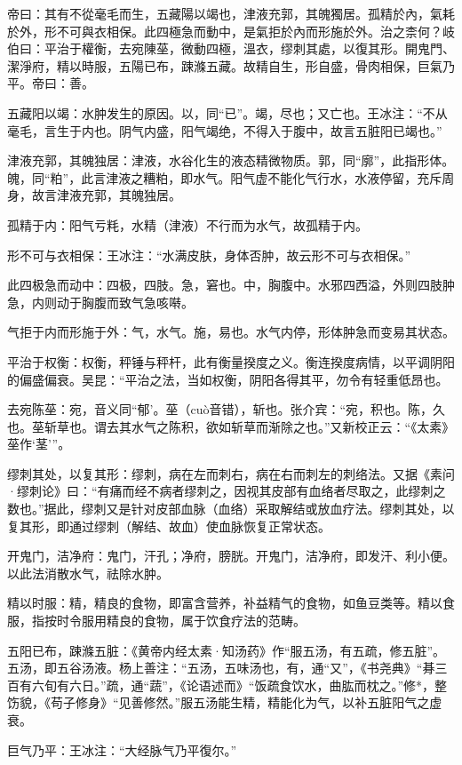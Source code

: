 \documentclass[draft,12pt]{ctexbook}
\begin{document}

\begin{yuanwen}
帝曰：其有不從毫毛而生，五藏陽以竭也，津液充郭，其魄獨居。孤精於內，氣耗於外，形不可與衣相保。此四極急而動中，是氣拒於內而形施於外。治之柰何？岐伯曰：平治于權衡，去宛陳莝，微動四極，溫衣，缪刺其處，以復其形。開鬼門、潔淨府，精以時服，五陽已布，踈滌五藏。故精自生，形自盛，骨肉相保，巨氣乃平。帝曰：善。
\end{yuanwen}


\begin{jiaozhu}
  \item 五藏阳以竭：水肿发生的原因。以，同“已”。竭，尽也；又亡也。王冰注：“不从毫毛，言生于内也。阴气内盛，阳气竭绝，不得入于腹中，故言五脏阳已竭也。”
  \item 津液充郭，其魄独居：津液，水谷化生的液态精微物质。郭，同“廓”，此指形体。魄，同“粕”，此言津液之糟粕，即水气。阳气虚不能化气行水，水液停留，充斥周身，故言津液充郭，其魄独居。
  \item 孤精于内：阳气亏粍，水精（津液）不行而为水气，故孤精于内。
  \item 形不可与衣相保：王冰注：“水满皮肤，身体否肿，故云形不可与衣相保。”
  \item 此四极急而动中：四极，四肢。急，窘也。中，胸腹中。水邪四西溢，外则四肢肿急，内则动于胸腹而致气急咳啭。
  \item 气拒于内而形施于外：气，水气。施，易也。水气内停，形体肿急而变易其状态。
  \item 平治于权衡：权衡，秤锤与秤杆，此有衡量揆度之义。衡连揆度病情，以平调阴阳的偏盛偏衰。吴昆：“平治之法，当如权衡，阴阳各得其平，勿令有轻重低昂也。
  \item 去宛陈莝：宛，音义同“郁'。莝（cuò音错），斩也。张介宾：“宛，积也。陈，久也。莝斩草也。谓去其水气之陈积，欲如斩草而渐除之也。”又新校正云：“《太素》莝作‘茎’”。
  \item 缪刺其处，以复其形：缪刺，病在左而刺右，病在右而刺左的刺络法。又据《素问·缪刺论》曰：“有痛而经不病者缪刺之，因视其皮部有血络者尽取之，此缪刺之数也。”据此，缪刺又是针对皮部血脉（血络）采取解结或放血疗法。缪刺其处，以复其形，即通过缪刺（解结、故血）使血脉恢复正常状态。
  \item 开鬼门，洁净府：鬼门，汗孔；净府，膀胱。开鬼门，洁净府，即发汗、利小便。以此法消散水气，祛除水肿。
  \item 精以时服：精，精良的食物，即富含营养，补益精气的食物，如鱼豆类等。精以食服，指按时令服用精良的食物，属于饮食疗法的范畴。
  \item 五阳已布，踈滌五脏：《黄帝内经太素·知汤药》作“服五汤，有五疏，修五脏”。五汤，即五谷汤液。杨上善注：“五汤，五味汤也，有，通“又”，《书尧典》“朞三百有六旬有六日。”疏，通“蔬”，《论语述而》“饭疏食饮水，曲肱而枕之。”修*，整饬貌，《苟子修身》“见善修然。”服五汤能生精，精能化为气，以补五脏阳气之虚衰。
  \item 巨气乃平：王冰注：“大经脉气乃平復尔。”
\end{jiaozhu}
\end{document}
